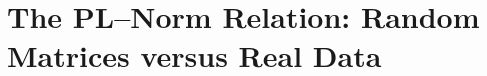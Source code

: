 {%





\section{The PL--Norm Relation: Random Matrices versus Real Data}
\label{sxn:appendix-random-vs-real}

}
